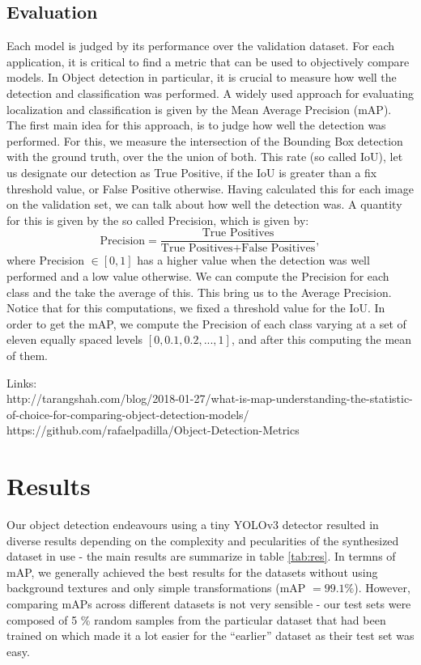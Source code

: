 \documentclass[a4paper]{article}
\begin{document}
\subsection{Evaluation}
Each model is judged by its performance over the validation dataset. For each application, it is critical to find a metric that can be used to objectively compare models.
In Object detection in particular, it is crucial to measure how well the detection and classification was performed.  
A widely used approach for evaluating localization and classification is given by the Mean Average Precision (mAP).  \\
The first main idea for this approach, is to judge how well the detection was performed.  For this, we measure the intersection of the Bounding Box detection with the ground truth, over the the union of both.  This rate (so called IoU), let us designate our detection as True Positive, if the IoU is greater than a fix threshold value, or False Positive otherwise.
Having calculated this for each image on the validation set, we can talk about how well the detection was.  A quantity for this is given by the so called Precision, which is given by:
\[\text{Precision} = \frac{\text{True Positives}}{\text{True Positives}+\text{False Positives}}, \]
where Precision $\in [0,1]$ has a higher value when the detection was well performed and a low value otherwise.
We can compute the Precision for each class and the take the average of this.  This bring us to the Average Precision. \\
Notice that for this computations, we fixed a threshold value for the IoU.   In order to get the mAP, we compute the Precision of each class varying at a set of eleven equally spaced levels 
$[0, 0.1, 0.2, ... , 1]$, and after this computing the mean of them. 


Links: \\
http://tarangshah.com/blog/2018-01-27/what-is-map-understanding-the-statistic-of-choice-for-comparing-object-detection-models/
\\
https://github.com/rafaelpadilla/Object-Detection-Metrics\\
\section{Results}
Our object detection endeavours using a tiny YOLOv3 detector resulted in diverse results depending on the complexity and pecularities of the synthesized dataset in use - the main results are summarize in table \ref{tab:res}. In termns of mAP, we generally achieved the best results for the datasets without using background textures and only simple transformations (mAP $=99.1 \%$). However, comparing mAPs across different datasets is not very sensible - our test sets were composed of 5 \% random samples from the particular dataset that had been trained on which made it a lot easier for the ``earlier'' dataset as their test set was easy.
\end{document}
